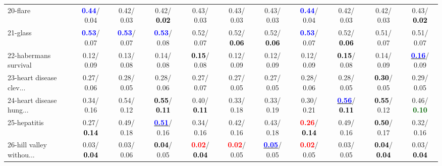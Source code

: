 \begin{table}[h]
\begin{center}
{\begin{tabular}{lc|c|c|c|c|c|c|c|c|c}
20-flare & \textcolor{blue}{\textbf{  0.44}}/  0.04 &   0.42/  0.03 &   0.42/\textcolor{black}{\textbf{  0.02}} &   0.43/  0.03 &   0.43/  0.03 &   0.43/  0.03 & \textcolor{blue}{\textbf{  0.44}}/  0.04 &   0.42/  0.03 &   0.42/  0.03 &   0.43/\textcolor{black}{\textbf{  0.02}} \\
21-glass & \textcolor{blue}{\textbf{  0.53}}/  0.07 & \textcolor{blue}{\textbf{  0.53}}/  0.07 & \textcolor{blue}{\textbf{  0.53}}/  0.08 &   0.52/  0.07 &   0.52/\textcolor{black}{\textbf{  0.06}} &   0.52/\textcolor{black}{\textbf{  0.06}} & \textcolor{blue}{\textbf{  0.53}}/  0.07 &   0.52/\textcolor{black}{\textbf{  0.06}} &   0.51/  0.07 &   0.51/  0.07 \\ \hline
22-habermans survival &   0.12/  0.09 &   0.13/  0.08 &   0.14/  0.08 & \textcolor{black}{\textbf{  0.15}}/  0.08 &   0.12/  0.09 &   0.12/  0.09 &   0.12/  0.09 & \textcolor{black}{\textbf{  0.15}}/  0.08 &   0.14/  0.09 & \underline{\textcolor{blue}{\textbf{  0.16}}}/  0.09 \\
23-heart disease clev... &   0.27/  0.06 &   0.28/  0.05 &   0.28/  0.06 &   0.27/  0.07 &   0.27/  0.05 &   0.27/  0.05 &   0.28/  0.06 &   0.28/  0.05 & \textcolor{black}{\textbf{  0.30}}/  0.05 &   0.29/  0.05 \\
24-heart disease hung... &   0.34/  0.16 &   0.54/  0.12 & \textcolor{black}{\textbf{  0.55}}/\textcolor{black}{\textbf{  0.11}} &   0.40/\textcolor{black}{\textbf{  0.11}} &   0.33/  0.18 &   0.33/  0.19 &   0.30/  0.21 & \underline{\textcolor{blue}{\textbf{  0.56}}}/\textcolor{black}{\textbf{  0.11}} & \textcolor{black}{\textbf{  0.55}}/  0.12 &   0.46/\textcolor{darkgreen}{\textbf{  0.10}} \\
25-hepatitis &   0.27/\textcolor{black}{\textbf{  0.14}} &   0.49/  0.18 & \underline{\textcolor{blue}{\textbf{  0.51}}}/  0.16 &   0.34/  0.16 &   0.42/  0.16 &   0.43/  0.18 & \textcolor{red}{\textbf{  0.26}}/\textcolor{black}{\textbf{  0.14}} &   0.49/  0.16 & \textcolor{black}{\textbf{  0.50}}/  0.17 &   0.32/  0.16 \\
26-hill valley withou... &   0.03/\textcolor{black}{\textbf{  0.04}} &   0.03/  0.06 & \textcolor{black}{\textbf{  0.04}}/  0.05 & \textcolor{red}{\textbf{  0.02}}/\textcolor{black}{\textbf{  0.04}} & \textcolor{red}{\textbf{  0.02}}/  0.05 & \underline{\textcolor{blue}{\textbf{  0.05}}}/  0.05 & \textcolor{red}{\textbf{  0.02}}/  0.05 &   0.03/  0.05 & \textcolor{black}{\textbf{  0.04}}/\textcolor{black}{\textbf{  0.04}} &   0.03/\textcolor{black}{\textbf{  0.04}} \\

\end{tabular}}
\end{center}
\end{table}
